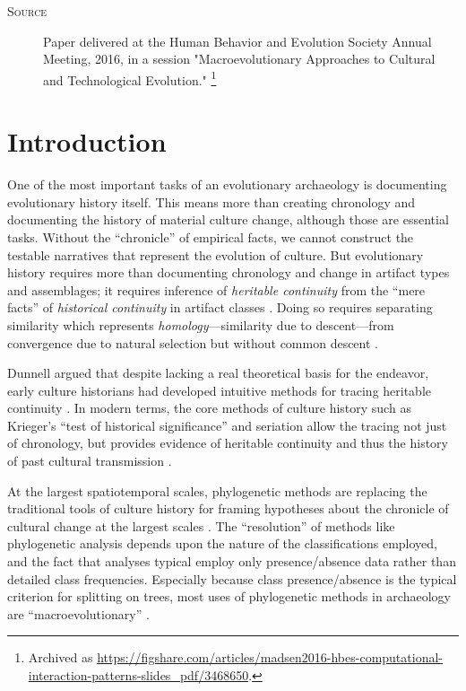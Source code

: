 
\begin{description}
    \item[\textsc{Source}]  Paper delivered at the Human Behavior and Evolution Society Annual Meeting, 2016, in a session "Macroevolutionary Approaches to Cultural and Technological Evolution."  
    \footnote{Archived as \url{https://figshare.com/articles/madsen2016-hbes-computational-interaction-patterns-slides_pdf/3468650}.}
    \end{description}
    
    
    \section{Introduction}\label{metapop:sec:introduction}
    
    One of the most important tasks of an evolutionary archaeology is documenting evolutionary history itself.  This means more than creating chronology and documenting the history of material culture change, although those are essential tasks.  Without the ``chronicle'' \citep{OHara1988} of empirical facts, we cannot construct the testable narratives that represent the evolution of culture.  But evolutionary history requires more than documenting chronology and change in artifact types and assemblages; it requires inference of \emph{heritable continuity} from the ``mere facts'' of \emph{historical continuity} in artifact classes \citep{o2000applying}.  Doing so requires separating similarity which represents \emph{homology}---similarity due to descent---from convergence due to natural selection but without common descent \citep{Dunnell1978,kroeber1931historical}.  
    
    Dunnell \citeyearpar{Dunnell1978,Dunnell1980,dunnell1989aspects} argued that despite lacking a real theoretical basis for the endeavor, early culture historians had developed intuitive methods for tracing heritable continuity \citep{o2000applying,lyman1997rise}.  In modern terms, the core methods of culture history such as Krieger's \citeyearpar{Krieger1944} ``test of historical significance'' and seriation \citep{Dunnell1970,Ford1935,Ford1936,Ford1949} allow the tracing not just of chronology, but provides evidence of heritable continuity and thus the history of past cultural transmission \citep{lyman2008cultural}.
    
    At the largest spatiotemporal scales, phylogenetic methods are replacing the traditional tools of culture history for framing hypotheses about the chronicle of cultural change at the largest scales  \citep{borgerhoff2006cultural,Lyman1997a,Lyman2006a,o1999seriation,o2000time,o2001cladistics,o2003cladistics,o2003resolving,OBrian2000,prentiss2019cultural,PRENTISS201564,Temkin2007}.  The ``resolution'' of methods like phylogenetic analysis depends upon the nature of the classifications employed, and the fact that analyses typical employ only presence/absence data rather than detailed class frequencies.  Especially because class presence/absence is the typical criterion for splitting on trees, most uses of phylogenetic methods in archaeology are ``macroevolutionary'' \citep{prentiss2019cultural}.  
    
